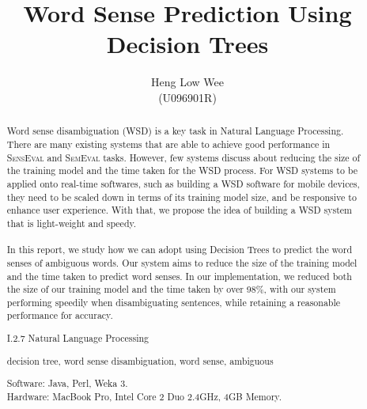 \documentclass[hyp]{socreport}
\begin{document}
\title{Word Sense Prediction Using Decision Trees}
\author{Heng Low Wee \\ (U096901R)}
\maketitle
\begin{abstract}
\paragraph{}
Word sense disambiguation (WSD) is a key task in Natural Language Processing. There are many existing systems that are able to achieve good performance in \textsc{SensEval} and \textsc{SemEval} tasks. However, few systems discuss about reducing the size of the training model and the time taken for the WSD process. For WSD systems to be applied onto real-time softwares, such as building a WSD software for mobile devices, they need to be scaled down in terms of its training model size, and be responsive to enhance user experience. With that, we propose the idea of building a WSD system that is light-weight and speedy.

\paragraph{}
In this report, we study how we can adopt using Decision Trees to predict the word senses of ambiguous words. Our system aims to reduce the size of the training model and the time taken to predict word senses. In our implementation, we reduced both the size of our training model and the time taken by over 98\%, with our system performing speedily when disambiguating sentences, while retaining a reasonable performance for accuracy.

\begin{descriptors}
	\item I.2.7 Natural Language Processing
\end{descriptors}
\begin{keywords}
	decision tree,  word sense disambiguation, word sense, ambiguous
\end{keywords}
\begin{implement}
\begin{flushleft}
\hspace{5 mm}Software: Java, Perl, Weka 3.\\
\hspace{5 mm}Hardware: MacBook Pro, Intel Core 2 Duo 2.4GHz, 4GB Memory.
\end{flushleft}
\end{implement}
\end{abstract}
\end{document}
